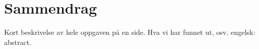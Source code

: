 \cleardoublepage

 \setcounter{page}{1}
\chapter*{Sammendrag}
{\color{red}Kort beskrivelse av hele oppgaven på en side. Hva vi har funnet ut, osv. engelsk: abstract. }

